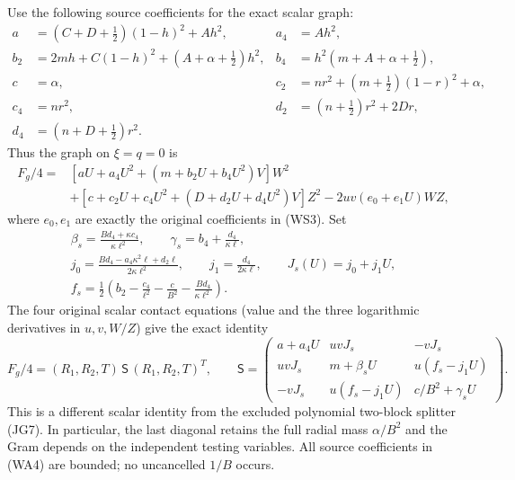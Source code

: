 Use the following source coefficients for the exact scalar graph:
\begin{align*}
 a&=(C+D+\tfrac12)(1-h)^2+Ah^2,&a_4&=Ah^2,\\
 b_2&=2mh+C(1-h)^2+(A+\alpha+\tfrac12)h^2,
 &b_4&=h^2(m+A+\alpha+\tfrac12),\\
 c&=\alpha,&c_2&=nr^2+(m+\tfrac12)(1-r)^2+\alpha,\\
 c_4&=nr^2,&d_2&=(n+\tfrac12)r^2+2Dr,\\
 d_4&=(n+D+\tfrac12)r^2.
\end{align*}
Thus the graph on $\xi=q=0$ is
\[
 \begin{split}
 F_g/4={}&[aU+a_4U^2+(m+b_2U+b_4U^2)V]W^2\\
 &+[c+c_2U+c_4U^2+(D+d_2U+d_4U^2)V]Z^2
       -2uv(e_0+e_1U)WZ,
 \end{split}
\]
where $e_0,e_1$ are exactly the original coefficients in (WS3).
Set
\[
 \begin{gathered}
 \beta_s=\frac{Bd_4+\kappa c_4}{\kappa\ell^2},\qquad
 \gamma_s=b_4+\frac{d_4}{\kappa\ell},\\
 j_0=\frac{Bd_4-a_4\kappa^2\ell+d_2\ell}
                   {2\kappa\ell^2},\qquad
 j_1=\frac{d_4}{2\kappa\ell},\qquad J_s(U)=j_0+j_1U,\\
 f_s=\frac12\left(b_2-\frac{c_4}{\ell^2}
                -\frac c{B^2}-\frac{Bd_4}{\kappa\ell^2}\right).
 \end{gathered}                                        \tag{WA4}
\]
The four original scalar contact equations (value and the three
logarithmic derivatives in $u,v,W/Z$) give the exact identity
\[
 F_g/4=(R_1,R_2,T)\,\mathsf S\,(R_1,R_2,T)^T,\qquad
 \mathsf S=
 \begin{pmatrix}
 a+a_4U&uvJ_s&-vJ_s\\
 uvJ_s&m+\beta_sU&u(f_s-j_1U)\\
 -vJ_s&u(f_s-j_1U)&c/B^2+\gamma_sU
 \end{pmatrix}.                                       \tag{WA5}
\]
This is a different scalar identity from the excluded polynomial
two-block splitter (JG7). In particular, the last diagonal retains
the full radial mass $\alpha/B^2$ and the Gram depends on the
independent testing variables. All source coefficients in (WA4)
are bounded; no uncancelled $1/B$ occurs.

